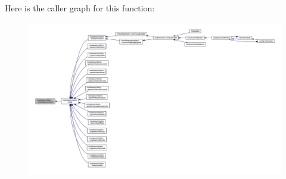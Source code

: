 Here is the caller graph for this function\+:\nopagebreak
\begin{figure}[H]
\begin{center}
\leavevmode
\includegraphics[width=350pt]{namespacemoduleassimilation_acb3e0bb143f8372bac2b99052ba4943d_icgraph}
\end{center}
\end{figure}
\mbox{\label{namespacemoduleassimilation_adb4698b9b7aa680222581e31452094dc}} 
